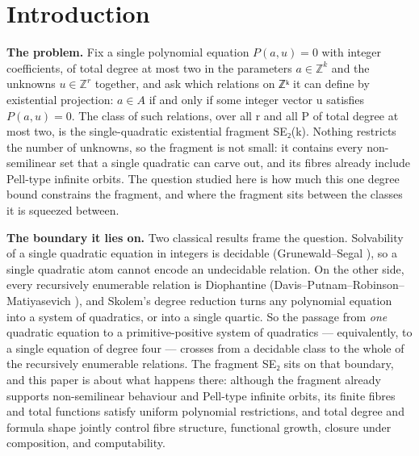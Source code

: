 \section*{Introduction}

\textbf{The problem.} Fix a single polynomial equation $P(a, u) = 0$ with integer coefficients, of total degree at most two in the parameters $a ∈ ℤ^{k}$ and the unknowns $u ∈ ℤ^{r}$ together, and ask which relations on ℤᵏ it can define by existential projection: $a ∈ A$ if and only if some integer vector u satisfies $P(a, u) = 0$. The class of such relations, over all r and all P of total degree at most two, is the single-quadratic existential fragment SE₂(k). Nothing restricts the number of unknowns, so the fragment is not small: it contains every non-semilinear set that a single quadratic can carve out, and its fibres already include Pell-type infinite orbits. The question studied here is how much this one degree bound constrains the fragment, and where the fragment sits between the classes it is squeezed between.

\textbf{The boundary it lies on.} Two classical results frame the question. Solvability of a single quadratic equation in integers is decidable (Grunewald–Segal \cite{GS04}), so a single quadratic atom cannot encode an undecidable relation. On the other side, every recursively enumerable relation is Diophantine (Davis–Putnam–Robinson–Matiyasevich \cite{DPR61,Mat70}), and Skolem's degree reduction \cite{Sko38} turns any polynomial equation into a system of quadratics, or into a single quartic. So the passage from \emph{one} quadratic equation to a primitive-positive system of quadratics — equivalently, to a single equation of degree four — crosses from a decidable class to the whole of the recursively enumerable relations. The fragment SE₂ sits on that boundary, and this paper is about what happens there: although the fragment already supports non-semilinear behaviour and Pell-type infinite orbits, its finite fibres and total functions satisfy uniform polynomial restrictions, and total degree and formula shape jointly control fibre structure, functional growth, closure under composition, and computability.

